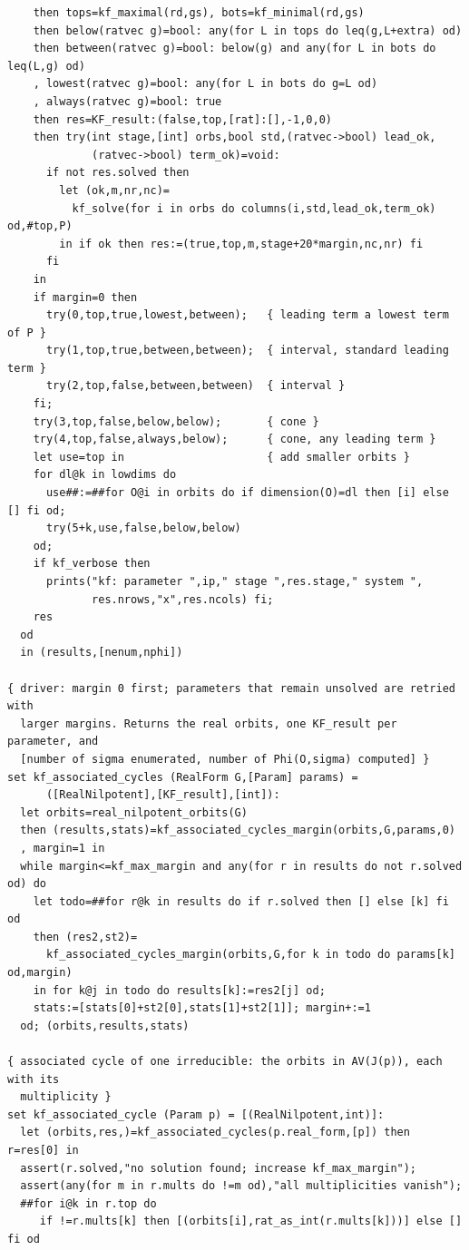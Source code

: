 \documentclass[11pt,leqno]{article}
\theoremstyle{definition}
\numberwithin{equation}{section}
\begin{document}
{\begin{verbatim}
    then tops=kf_maximal(rd,gs), bots=kf_minimal(rd,gs)
    then below(ratvec g)=bool: any(for L in tops do leq(g,L+extra) od)
    then between(ratvec g)=bool: below(g) and any(for L in bots do leq(L,g) od)
    , lowest(ratvec g)=bool: any(for L in bots do g=L od)
    , always(ratvec g)=bool: true
    then res=KF_result:(false,top,[rat]:[],-1,0,0)
    then try(int stage,[int] orbs,bool std,(ratvec->bool) lead_ok,
             (ratvec->bool) term_ok)=void:
      if not res.solved then
        let (ok,m,nr,nc)=
          kf_solve(for i in orbs do columns(i,std,lead_ok,term_ok) od,#top,P)
        in if ok then res:=(true,top,m,stage+20*margin,nc,nr) fi
      fi
    in
    if margin=0 then
      try(0,top,true,lowest,between);   { leading term a lowest term of P }
      try(1,top,true,between,between);  { interval, standard leading term }
      try(2,top,false,between,between)  { interval }
    fi;
    try(3,top,false,below,below);       { cone }
    try(4,top,false,always,below);      { cone, any leading term }
    let use=top in                      { add smaller orbits }
    for dl@k in lowdims do
      use##:=##for O@i in orbits do if dimension(O)=dl then [i] else [] fi od;
      try(5+k,use,false,below,below)
    od;
    if kf_verbose then
      prints("kf: parameter ",ip," stage ",res.stage," system ",
             res.nrows,"x",res.ncols) fi;
    res
  od
  in (results,[nenum,nphi])

{ driver: margin 0 first; parameters that remain unsolved are retried with
  larger margins. Returns the real orbits, one KF_result per parameter, and
  [number of sigma enumerated, number of Phi(O,sigma) computed] }
set kf_associated_cycles (RealForm G,[Param] params) =
      ([RealNilpotent],[KF_result],[int]):
  let orbits=real_nilpotent_orbits(G)
  then (results,stats)=kf_associated_cycles_margin(orbits,G,params,0)
  , margin=1 in
  while margin<=kf_max_margin and any(for r in results do not r.solved od) do
    let todo=##for r@k in results do if r.solved then [] else [k] fi od
    then (res2,st2)=
      kf_associated_cycles_margin(orbits,G,for k in todo do params[k] od,margin)
    in for k@j in todo do results[k]:=res2[j] od;
    stats:=[stats[0]+st2[0],stats[1]+st2[1]]; margin+:=1
  od; (orbits,results,stats)

{ associated cycle of one irreducible: the orbits in AV(J(p)), each with its
  multiplicity }
set kf_associated_cycle (Param p) = [(RealNilpotent,int)]:
  let (orbits,res,)=kf_associated_cycles(p.real_form,[p]) then r=res[0] in
  assert(r.solved,"no solution found; increase kf_max_margin");
  assert(any(for m in r.mults do !=m od),"all multiplicities vanish");
  ##for i@k in r.top do
     if !=r.mults[k] then [(orbits[i],rat_as_int(r.mults[k]))] else [] fi od
\end{verbatim}
}
\end{document}
